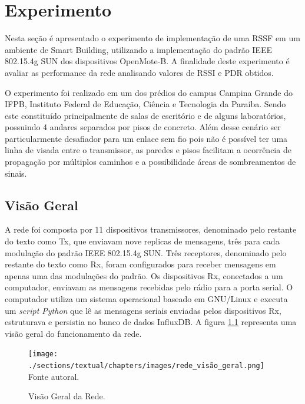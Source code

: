 \chapter{Experimento}
\label{experimento}

Nesta seção é apresentado o experimento de implementação de uma RSSF em um ambiente de Smart Building, utilizando a implementação do padrão IEEE 802.15.4g SUN dos dispositivos OpenMote-B. A finalidade deste experimento é avaliar as performance da rede analisando valores de RSSI e PDR obtidos.

O experimento foi realizado em um dos prédios do campus Campina Grande do IFPB, Instituto Federal de Educação, Ciência e Tecnologia da Paraíba. Sendo este constituído principalmente de salas de escritório e de alguns laboratórios, possuindo 4 andares separados por pisos de concreto. Além desse cenário ser particularmente desafiador para um enlace sem fio pois não é possível ter uma linha de visada entre o transmissor, as paredes e pisos facilitam a ocorrência de propagação por múltiplos caminhos e a possibilidade áreas de sombreamentos de sinais.

\section{Visão Geral}
\label{subsec:visaogeral}
A rede foi composta por 11 dispositivos transmissores, denominado pelo restante do texto como Tx, que enviavam nove replicas de mensagens, três para cada modulação do padrão IEEE 802.15.4g SUN. Três receptores, denominado pelo restante do texto como Rx, foram configurados para receber mensagens em apenas uma das modulações do padrão. Os dispositivos Rx, conectados a um computador, enviavam as mensagens recebidas pelo rádio para a porta serial. O computador utiliza um sistema operacional baseado em GNU/Linux e executa um \emph{script Python} que lê as mensagens seriais enviadas pelos dispositivos Rx, estruturava e persistia no banco de dados InfluxDB. A figura \ref{fig:rede_visão_geral} representa uma visão geral do funcionamento da rede.

\begin{figure}[h]
    \begin{center}
        \caption{Visão Geral da Rede.}
        \texttt{[image: ./sections/textual/chapters/images/rede\_visão\_geral.png]}\\
        Fonte autoral.
        \label{fig:rede_visão_geral}
    \end{center}
\end{figure}

